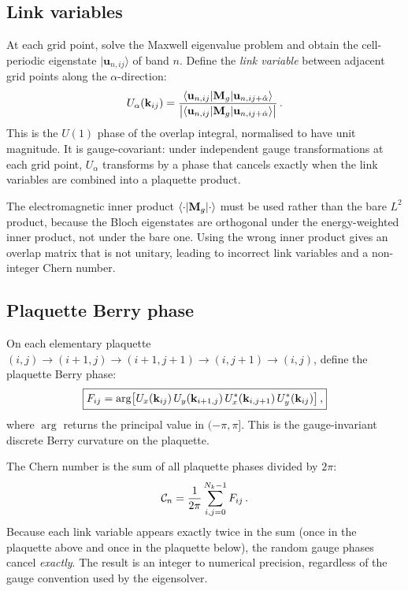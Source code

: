 \subsection{Link variables}
\label{sec:ch10-link}

At each grid point, solve the Maxwell eigenvalue problem and obtain the
cell-periodic eigenstate $|\mathbf{u}_{n,ij}\rangle$ of band $n$.
Define the \emph{link variable} between adjacent grid points along the
$\alpha$-direction:
\begin{equation}\label{eq:ch10-link-def}
  U_\alpha(\mathbf{k}_{ij})
  = \frac{\langle\mathbf{u}_{n,ij}|\mathbf{M}_g|\mathbf{u}_{n,ij+\hat\alpha}\rangle}
  {\bigl|\langle\mathbf{u}_{n,ij}|\mathbf{M}_g|\mathbf{u}_{n,ij+\hat\alpha}
  \rangle\bigr|}\,.
\end{equation}
This is the $U(1)$ phase of the overlap integral, normalised to have
unit magnitude.  It is gauge-covariant: under independent gauge
transformations at each grid point, $U_\alpha$ transforms by a phase
that cancels exactly when the link variables are combined into a
plaquette product.

The electromagnetic inner product $\langle\cdot|\mathbf{M}_g|\cdot\rangle$
must be used rather than the bare $L^2$ product, because the Bloch
eigenstates are orthogonal under the energy-weighted inner product, not
under the bare one.  Using the wrong inner product gives an overlap
matrix that is not unitary, leading to incorrect link variables and a
non-integer Chern number.

\subsection{Plaquette Berry phase}
\label{sec:ch10-plaquette-phase}

On each elementary plaquette $(i,j)\to(i+1,j)\to(i+1,j+1)\to(i,j+1)
\to(i,j)$, define the plaquette Berry phase:
\begin{equation}\label{eq:ch10-plaquette-F}
  \boxed{%
  F_{ij} = \arg\bigl[
  U_x(\kvec_{ij})\,U_y(\kvec_{i+1,j})\,
  U_x^*(\kvec_{i,j+1})\,U_y^*(\kvec_{ij})
  \bigr]\,,}
\end{equation}
where $\arg$ returns the principal value in $(-\pi,\pi]$.  This is the
gauge-invariant discrete Berry curvature on the plaquette.

The Chern number is the sum of all plaquette phases divided by $2\pi$:
\begin{equation}\label{eq:ch10-chern-sum}
  \mathcal{C}_n = \frac{1}{2\pi}\sum_{i,j=0}^{N_k-1}F_{ij}\,.
\end{equation}
Because each link variable appears exactly twice in the sum (once in the
plaquette above and once in the plaquette below), the random gauge phases
cancel \emph{exactly}.  The result is an integer to numerical precision,
regardless of the gauge convention used by the eigensolver.

